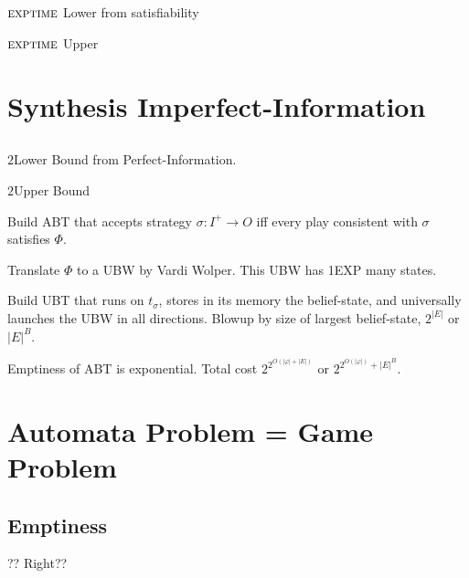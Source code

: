 \documentclass[a4paper,10pt]{article}
\begin{document}
\subsection{\CTL}

$\textsc{exptime}$ Lower from satisfiability \cite{FL97}

$\textsc{exptime}$ Upper \cite{KV97}

\section{Synthesis Imperfect-Information}

\subsection{\LTL}

$2$\exptime Lower Bound from Perfect-Information.

$2$\exptime Upper Bound \cite{KVV97}

Build ABT that accepts strategy $\sigma:I^+ \to O$ iff every play consistent with $\sigma$ satisfies $\Phi$.
\en
\item Translate $\Phi$ to a UBW by Vardi Wolper. This UBW has 1EXP many states.
\item Build UBT that runs on $t_\sigma$, stores in its memory the belief-state, and universally launches the UBW in all directions. Blowup by size of largest belief-state, 
$2^{|E|}$ or $|E|^B$.
\item Emptiness of ABT is exponential. Total cost $2^{2^{O(|\varphi| + |E|)}}$ or $2^{2^{O(|\varphi|)} + |E|^B}$.
\ne

\subsection{\CTLS}

\subsection{\CTL}

\section{Automata Problem = Game Problem}

\subsection{Emptiness}

?? Right??
\end{document}
